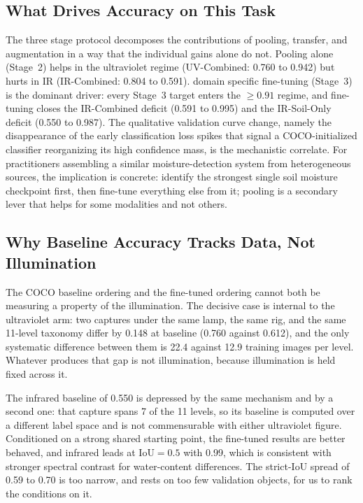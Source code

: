 ﻿\documentclass[journal]{IEEEtran}
\begin{document}
\subsection{What Drives Accuracy on This Task}
The three stage protocol decomposes the contributions of pooling, transfer, and augmentation in a way that the individual gains alone do not. Pooling alone (Stage~2) helps in the ultraviolet regime (UV-Combined: 0.760 to 0.942) but hurts in IR (IR-Combined: 0.804 to 0.591). domain specific fine-tuning (Stage~3) is the dominant driver: every Stage~3 target enters the $\geq 0.91$ regime, and fine-tuning closes the IR-Combined deficit (0.591 to 0.995) and the IR-Soil-Only deficit (0.550 to 0.987). The qualitative validation curve change, namely the disappearance of the early classification loss spikes that signal a COCO-initialized classifier reorganizing its high confidence mass, is the mechanistic correlate. For practitioners assembling a similar moisture-detection system from heterogeneous sources, the implication is concrete: identify the strongest single soil moisture checkpoint first, then fine-tune everything else from it; pooling is a secondary lever that helps for some modalities and not others.

\subsection{Why Baseline Accuracy Tracks Data, Not Illumination}
The COCO baseline ordering and the fine-tuned ordering cannot both be measuring a property of the illumination. The decisive case is internal to the ultraviolet arm: two captures under the same lamp, the same rig, and the same 11-level taxonomy differ by 0.148 at baseline (0.760 against 0.612), and the only systematic difference between them is 22.4 against 12.9 training images per level. Whatever produces that gap is not illumination, because illumination is held fixed across it.

The infrared baseline of 0.550 is depressed by the same mechanism and by a second one: that capture spans 7 of the 11 levels, so its baseline is computed over a different label space and is not commensurable with either ultraviolet figure. Conditioned on a strong shared starting point, the fine-tuned results are better behaved, and infrared leads at $\text{IoU}=0.5$ with 0.99, which is consistent with stronger spectral contrast for water-content differences. The strict-IoU spread of 0.59 to 0.70 is too narrow, and rests on too few validation objects, for us to rank the conditions on it.
\end{document}
